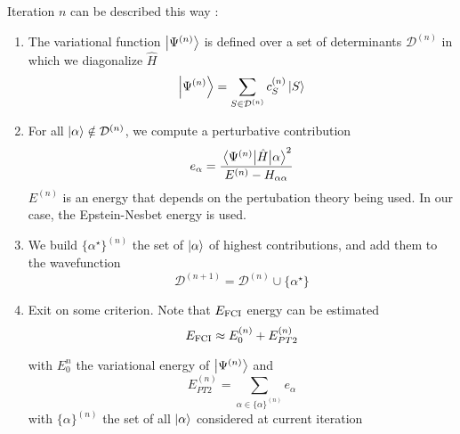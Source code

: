 \documentclass[./thesis.tex]{subfiles}
\begin{document}
Iteration $n$ can be described this way :
\begin{enumerate}
\item

The variational function $\ket {\Psi^{(n)}}$ is defined over a set of determinants $  \mathcal{D}^{(n)}$ in which we diagonalize $\widehat{H}$
\begin{equation}
\ket{\Psi^{(n)}} = \sum_{S \in \mathcal{D}^{(n)}} c_S^{(n)} \ket{S}
\end{equation}

\item
For all ${\ket{\alpha}} \notin \mathcal{D}^{(n)}$, we compute a perturbative contribution
\begin{equation}
e_\alpha = \frac{\mel{\Psi^{(n)}}{\hat{H}}{\alpha}^2}{E^{(n)} - H_{\alpha \alpha}}
\end{equation}
$E^{(n)}$ is an energy that depends on the pertubation theory being used. In our case, the Epstein-Nesbet energy is used.

\item
We build $\{ \alpha^\star \}^{(n)}$ the set of ${\ket{\alpha}}$ of highest contributions, and add them to the wavefunction
\begin{equation}
\mathcal{D}^{(n+1)} = \mathcal{D}^{(n)} \cup \{ \alpha^\star \}
\end{equation}

\item
Exit on some criterion. Note that $E_\text{FCI}$ energy can be estimated
\begin{equation}
E_\text{FCI} \approx E^{(n)}_0 + E_{PT2}^{(n)}
\end{equation}


with $E^n_0$ the variational energy of $\ket {\Psi^{(n)}}$ and
\begin{equation}
E_{PT2}^{(n)} = \sum_{\alpha \in \{\alpha \}^{(n)}} e_\alpha
\end{equation}
with $\{ \alpha \}^{(n)}$ the set of all ${\ket{\alpha}}$ considered at current iteration

\end{enumerate}
\end{document}
